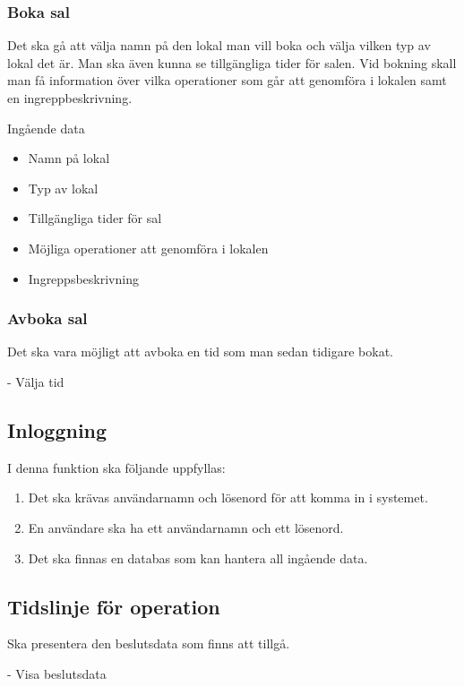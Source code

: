 \documentclass[a4paper,10pt, twoside]{article}
\begin{document}
\subsubsection{Boka sal}
\label{sec: Boka sal}
Det ska gå att välja namn på den lokal man vill boka och välja vilken typ av lokal det är. Man ska även kunna se 
tillgängliga tider för salen. Vid bokning skall man få information över vilka operationer som går att genomföra i lokalen 
samt en ingreppbeskrivning.

Ingående data
\begin{multicols}{2}
\begin{itemize}
	\item Namn på lokal
	\item Typ av lokal
	\item Tillgängliga tider för sal
	\item Möjliga operationer att genomföra i lokalen
	\item Ingreppsbeskrivning
\end{itemize}
\end{multicols}

\subsubsection{Avboka sal}
\label{sec: Avboka sal}
Det ska vara möjligt att avboka en tid som man sedan tidigare bokat.

- Välja tid

\subsection{Inloggning}
\label{sec: Inloggning}
I denna funktion ska följande uppfyllas:
\begin{enumerate}
	\item Det ska krävas användarnamn och lösenord för att komma in i systemet.
  	\item En användare ska ha ett användarnamn och ett lösenord.
  	\item Det ska finnas en databas som kan hantera all ingående data.
\end{enumerate}

\subsection{Tidslinje för operation}
\label{sec: Tidlinje för operation}
Ska presentera den beslutsdata som finns att tillgå.

-	Visa beslutsdata
\end{document}
